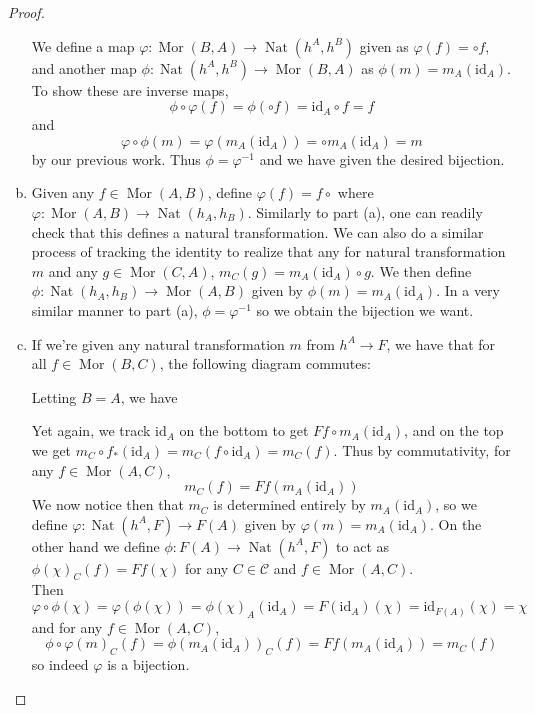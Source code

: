 \documentclass{article}
\newcommand{\id}{\mathrm{id}}
\newcommand{\fC}{\mathscr{C}}
\DeclareMathOperator{\Mor}{\mathrm{Mor}}
\DeclareMathOperator{\Nat}{\mathrm{Nat}}
\begin{document}
\begin{proof}
\begin{enumerate}[(a)]
        \newline
        We define a map $\varphi:\Mor(B,A)\to \Nat(h^A,h^B)$ given as $\varphi(f)=\circ f$, and another map $\phi:\Nat(h^A,h^B)\to \Mor(B,A)$ as $\phi(m)=m_A(\id_A)$. To show these are inverse maps, 
        \[
        \phi \circ \varphi(f)=\phi(\circ f)=\id_A\circ f=f
        \]
        and
        \[
        \varphi \circ \phi(m)=\varphi(m_A(\id_A))=\circ m_A(\id_A)=m
        \]
        by our previous work. Thus $\phi=\varphi^{-1}$ and we have given the desired bijection.
        \item 
        Given any $f\in \Mor(A,B)$, define $\varphi(f)=f\circ$ where $\varphi:\Mor(A,B)\to \Nat(h_A,h_B)$. Similarly to part (a), one can readily check that this defines a natural transformation. We can also do a similar process of tracking the identity to realize that any for natural transformation $m$ and any $g\in \Mor(C,A)$, $m_C(g)=m_A(\id_A)\circ g$. We then define $\phi:\Nat(h_A,h_B)\to \Mor(A,B)$ given by $\phi(m)=m_A(\id_A)$. In a very similar manner to part (a), $\phi=\varphi^{-1}$ so we obtain the bijection we want.
        \item 
        If we're given any natural transformation $m$ from $h^A\to F$, we have that for all $f\in \Mor(B,C)$, the following diagram commutes:
        \begin{center}
        \end{center}
        Letting $B=A$, we have
        \begin{center}
        \end{center}
        Yet again, we track $\id_A$ on the bottom to get $Ff\circ m_A(\id_A)$, and on the top we get $m_C\circ f_*(\id_A)=m_C(f\circ \id_A)=m_C(f)$. Thus by commutativity, for any $f\in \Mor(A,C)$, 
        \[
        m_C(f)=Ff(m_A(\id_A))
        \]
        We now notice then that $m_C$ is determined entirely by $m_A(\id_A)$, so we define $\varphi:\Nat(h^A,F)\to F(A)$ given by $\varphi(m)=m_A(\id_A)$. On the other hand we define $\phi:F(A)\to \Nat(h^A,F)$ to act as $\phi(\chi)_C(f)=Ff(\chi)$ for any $C\in \fC$ and $f\in \Mor(A,C)$.\\
        \newline
        Then
        \[
        \varphi\circ \phi(\chi)=\varphi( \phi(\chi))=\phi(\chi)_A(\id_A)=F(\id_A)(\chi)=\id_{F(A)}(\chi)=\chi
        \]
        and for any $f\in \Mor(A,C)$,
        \[
        \phi\circ \varphi(m)_C(f)=\phi(m_A(\id_A))_C(f)=Ff(m_A(\id_A))=m_C(f)
        \]
        so indeed $\varphi$ is a bijection.
    \end{enumerate}
\end{proof}
\end{document}
